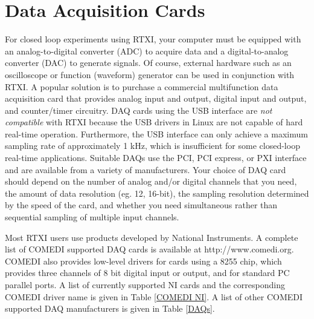 
\section{Data Acquisition Cards}
\label{dataacquisition}

For closed loop experiments using RTXI, your computer must be equipped with an analog-to-digital converter (ADC) to acquire data and a digital-to-analog converter (DAC) to generate signals. Of course, external hardware such as an oscilloscope or function (waveform) generator can be used in conjunction with RTXI. A popular solution is to purchase a commercial multifunction data acquisition card that provides analog input and output, digital input and output, and counter/timer circuitry. DAQ cards using the USB interface are \attention \emph{not compatible} with RTXI because the USB drivers in Linux are not capable of hard real-time operation. Furthermore, the USB interface can only achieve a maximum sampling rate of approximately 1 kHz, which is insufficient for some closed-loop real-time applications. Suitable DAQs use the PCI, PCI express, or PXI interface and are available from a variety of manufacturers. Your choice of DAQ card should depend on the number of analog and/or digital channels that you need, the amount of data resolution (eg. 12, 16-bit), the sampling resolution determined by the speed of the card, and whether you need simultaneous rather than sequential sampling of multiple input channels. 

Most RTXI users use products developed by National Instruments. \attention A complete list of COMEDI supported DAQ cards is available at http://www.comedi.org. COMEDI also provides low-level drivers for cards using a 8255 chip, which provides three channels of 8 bit digital input or output, and for standard PC parallel ports. A list of currently supported NI cards and the corresponding COMEDI driver name is given in Table \ref{COMEDI NI}. A list of other COMEDI supported DAQ manufacturers is given in Table \ref{DAQs}.

